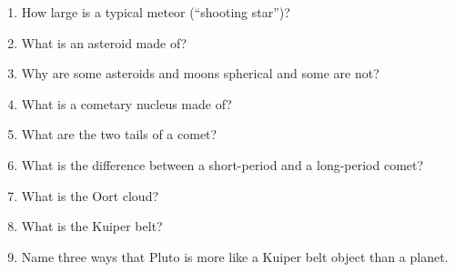 
\begin{enumerate}
\item How large is a typical meteor (``shooting star'')?
\vspace{80pt}
\item What is an asteroid made of?
\vspace{80pt}
\item Why are some asteroids and moons spherical and some are not?
\vspace{80pt}
\item What is a cometary nucleus made of?
\vspace{80pt}
\item What are the two tails of a comet?
\vspace{80pt}
\item What is the difference between a short-period and a long-period
  comet?
\vspace{80pt}
\item What is the Oort cloud?
\vspace{80pt}
\item What is the Kuiper belt?
\vspace{80pt}
\item Name three ways that Pluto is more like a Kuiper belt object
  than a planet.
\vspace{80pt}
\end{enumerate}

